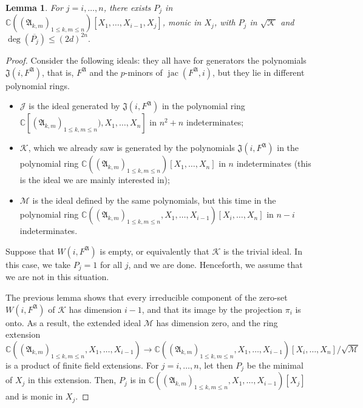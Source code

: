 \documentclass[12pt]{article}
\def\frkJ{\mathfrak{J}}
\def\A{\mathfrak{A}}
\DeclareMathOperator{\jac}{jac}
\def\C{\mathbb{C}}
\newtheorem{lemma}[theorem]{Lemma}
\begin{document}
\begin{lemma}\label{lemma:boundP}
  For $j = i,\dots,n$, there exists $P_j$ in $\C((\A_{k,m})_{1 \le k,m
    \le n})[X_1,\dots,X_{i-1},X_j]$, monic in $X_j$, with $P_{j}$ in
  $\sqrt{\mathscr{K}}$ and $\deg(\overline{ P_j})\leq (2d)^{2n}.$
\end{lemma}
\begin{proof} 
  Consider the following ideals: they all have for generators the
  polynomials $\frkJ(i,F^\A)$, that is, $F^\A$ and the $p$-minors of
  $\jac(F^\A, i)$, but they lie in different polynomial rings.
  \begin{itemize}
  \item $\mathscr{J}$ is the ideal generated by $\frkJ(i,F^\A)$ in the
    polynomial ring $\C[(\A_{k,m})_{1 \le k,m \le n}),X_1,\dots,X_n]$
    in $n^2+n$ indeterminates;
  \item $\mathscr{K}$, which we already saw is generated by the
    polynomials $\frkJ(i,F^\A)$ in the polynomial ring  $\C((\A_{k,m})_{1 \le k,m \le
      n})[X_1,\dots,X_n]$ in $n$ indeterminates (this is the ideal we
    are mainly interested in);
  \item $\mathscr{M}$ is the ideal defined by the same polynomials,
    but this time in the polynomial ring $\C((\A_{k,m})_{1 \le k,m \le
      n},X_1,\dots,X_{i-1})[X_{i},\dots,X_n]$ in $n-i$ indeterminates.
  \end{itemize}
   Suppose that
  $W(i,F^\A)$ is empty, or equivalently that $\mathscr{K}$ is the
  trivial ideal. In this case, we take $P_j=1$ for all $j$, and we are
  done. Henceforth, we assume that we are not in this situation.

  \smallskip{}  The previous
  lemma shows that every irreducible component of the zero-set
  $W(i,F^\A)$ of $\mathscr{K}$ has dimension $i-1$, and that its image
  by the projection $\pi_i$ is onto. As a result, the extended ideal
  $\mathscr{M}$ has dimension zero, and the ring extension
  \[  \C((\A_{k,m})_{1 \le k,m \le
    n},X_1,\dots,X_{i-1}) \to \C((\A_{k,m})_{1 \le k,m \le
    n},X_1,\dots,X_{i-1})[X_{i},\dots,X_n]/\sqrt{\mathscr{M}}\] is a product
  of finite field extensions. For $j=i,\dots,n$, let then $P_j$ be the
  minimal of $X_j$ in this extension. Then, $P_j$ is in
  $\C((\A_{k,m})_{1 \le k,m \le n},X_1,\dots,X_{i-1})[X_j]$ and is
  monic in $X_j$.


\end{proof}
\end{document}
